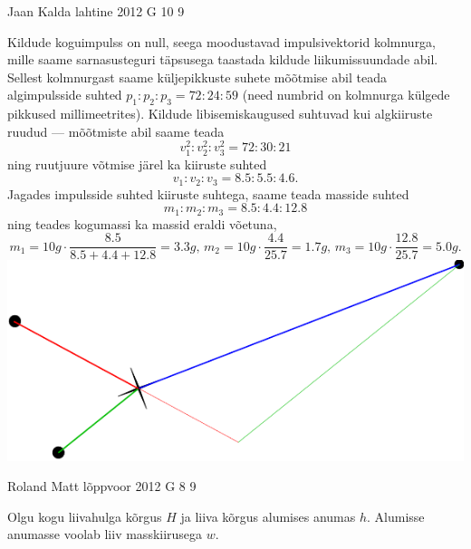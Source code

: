 \documentclass[11pt, twoside]{article}
\begin{document}
{%
{Jaan Kalda} %
{lahtine} %
{2012} %
{G 10} %
{9} %
{

\ifSolution
Kildude koguimpulss on null, seega moodustavad impulsivektorid kolmnurga, mille saame sarnasusteguri täpsusega taastada kildude liikumissuundade abil.
Sellest kolmnurgast saame küljepikkuste suhete mõõtmise abil teada algimpulsside suhted $p_1 : p_2: p_3 = \num{72} : \num{24} : \num{59}$ (need numbrid on 
kolmnurga külgede pikkused millimeetrites). 
Kildude libisemiskaugused suhtuvad kui algkiiruste ruudud --- mõõtmiste abil saame teada 
\[
v_1^2:v_2^2:v_3^2 = \num{72}:\num{30}:\num{21}
\]
ning ruutjuure võtmise järel ka 
kiiruste suhted
\[
v_1 : v_2: v_3 = \num{8,5}:\num{5,5}:\num{4,6}.
\]
Jagades impulsside suhted kiiruste suhtega, saame teada masside suhted
\[
m_1:m_2:m_3=\num{8,5}:\num{4,4}:\num{12,8}
\]
ning teades kogumassi ka massid eraldi võetuna,
\[
m_1=\SI {10}g\cdot \frac{\num{8,5}}{\num{8,5}+\num{4,4}+\num{12,8}} = \SI{3,3}g\text{, }m_2=\SI {10}g\cdot \frac{\num{4,4}}{\num{25,7}}=\SI{1,7}g\text{, } 
m_3=\SI {10}g\cdot \frac{\num{12,8}}{\num{25,7}}=\SI{5,0}g.
\]
\hspace*{0\columnwidth}\includegraphics[width=\columnwidth]{2012-lahg-10-killud_lah}
\fi
}

{Roland Matt} %
{lõppvoor} %
{2012} %
{G 8} %
{9} %
{

\ifSolution
Olgu kogu liivahulga kõrgus $H$ ja liiva kõrgus alumises anumas $h$. Alumisse anumasse voolab liiv masskiirusega $w$. 


}}
\end{document}

